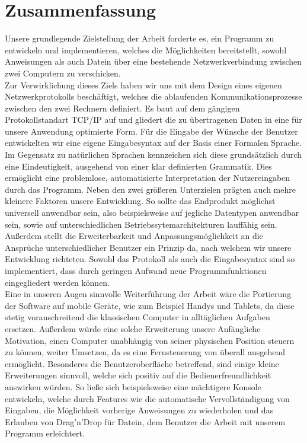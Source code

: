 \documentclass[12pt,a4paper]{scrartcl}
\begin{document}
\section*{Zusammenfassung}
Unsere grundlegende Zielstellung der Arbeit forderte es, ein Programm zu entwickeln und implementieren, welches die Möglichkeiten bereitstellt, sowohl Anweisungen als auch Datein über eine bestehende Netzwerkverbindung zwischen zwei Computern zu verschicken.\\
Zur Verwirklichung dieses Ziels haben wir uns mit dem Design eines eigenen Netzwerkprotokolls beschäftigt, welches die ablaufenden Kommunikationsprozesse zwischen den zwei Rechnern definiert. Es baut auf dem gängigen Protokollstandart TCP/IP auf und gliedert die zu übertragenen Daten in eine für unsere Anwendung optimierte Form. 
Für die Eingabe der Wünsche der Benutzer entwickelten wir eine eigene Eingabesyntax auf der Basis einer Formalen Sprache. Im Gegensatz zu natürlichen Sprachen kennzeichen sich diese grundsätzlich durch eine Eindeutigkeit, ausgehend von einer klar definierten Grammatik. Dies ermöglicht eine problemlose, automatisierte Interpretation der Nutzereingaben durch das Programm.
Neben den zwei größeren Unterzielen prägten auch mehre kleinere Faktoren unsere Entwicklung. So sollte das Endprodukt möglichst universell anwendbar sein, also beispielsweise auf jegliche Datentypen anwendbar sein, sowie auf unterschiedlichen Betriebssytemarchitekturen lauffähig sein. Außerdem stellt die Erweiterbarkeit und Anpassungsmöglichkeit an die Ansprüche unterschiedlicher Benutzer ein Prinzip da, nach welchem wir unsere Entwicklung richteten. Sowohl das Protokoll als auch die Eingabesyntax sind so implementiert, dass durch geringen Aufwand neue Programmfunktionen eingegliedert werden können.\\
Eine in unseren Augen sinnvolle Weiterführung der Arbeit wäre die Portierung der Software auf mobile Geräte, wie zum Beispiel Handys und Tablets, da diese stetig voranschreitend die klassischen Computer in alltäglichen Aufgaben ersetzen. Außerdem würde eine solche Erweiterung unsere Anfängliche Motivation, einen Computer unabhängig von seiner physischen Position steuern zu können, weiter Umsetzen, da es eine Fernsteuerung von überall ausgehend ermöglicht. Besonderes die Benutzeroberfläche betreffend, sind einige kleine Erweiterungen sinnvoll, welche sich positiv auf die Bedienerfreundlichkeit auswirken würden. So ließe sich beispielsweise eine mächtigere Konsole entwickeln, welche durch Features wie die automatische Vervollständigung von Eingaben, die Möglichkeit vorherige Anweisungen zu wiederholen und das Erlauben von Drag’n’Drop für Datein, dem Benutzer die Arbeit mit unserem Programm erleichtert.\\ 
\end{document}
